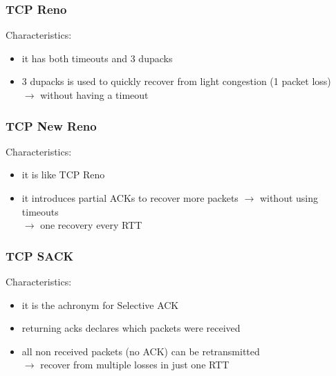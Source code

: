 \subsubsection{TCP Reno}
Characteristics:
\begin{itemize}
    \item it has both timeouts and 3 dupacks
    \item 3 dupacks is used to quickly recover from light congestion (1 packet loss)\\
    $\rightarrow$ without having a timeout
\end{itemize}
\subsubsection{TCP New Reno}
Characteristics:
\begin{itemize}
    \item it is like TCP Reno
    \item it introduces partial ACKs to recover more packets $\rightarrow$ without using timeouts\\
    $\rightarrow$ one recovery every RTT
\end{itemize}
\subsubsection{TCP SACK}
Characteristics:
\begin{itemize}
    \item it is the achronym for Selective ACK
    \item returning acks declares which packets were received
    \item all non received packets (no ACK) can be retransmitted\\
    $\rightarrow$ recover from multiple losses in just one RTT
\end{itemize}
